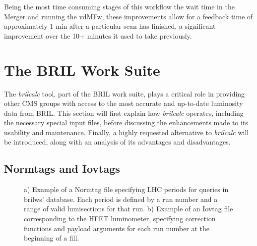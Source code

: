 Being the most time consuming stages of this workflow the wait time in the Merger and running the vdMFw, these improvements allow for a feedback time of approximately 1 min after a particular scan has finished, a significant improvement over the 10+ minutes it used to take previously.
 

\section{The BRIL Work Suite}
\label{sec:the_bril_work_suite}

The \textit{brilcalc} tool, part of the BRIL work suite, plays a critical role in providing other CMS groups with access to the most accurate and up-to-date luminosity data from BRIL. This section will first explain how \textit{brilcalc} operates, including the necessary special input files, before discussing the enhancements made to its usability and maintenance. Finally, a highly requested alternative to \textit{brilcalc} will be introduced, along with an analysis of its advantages and disadvantages.

\subsection{Normtags and Iovtags}

\begin{figure}[!htb]
	\centering
	\caption[Illustration of iovtag and normtag file structure]{a) Example of a Normtag file specifying LHC periods for queries in brilws' database. Each period is defined by a run number and a range of valid lumisections for that run. b) Example of an Iovtag file corresponding to the HFET luminometer, specifying correction functions and payload arguments for each run number at the beginning of a fill.}
	\label{fig:normtag_iovtag}
\end{figure}

